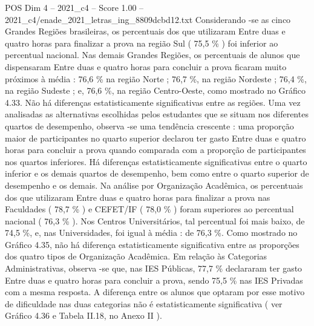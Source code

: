 \begin{textsample}{POS Dim 4 – 2021\_c4 – Score 1.00 – 2021\_c4/enade\_2021\_letras\_ing\_8809dcbd12.txt}
Considerando -se as cinco Grandes Regiões brasileiras, os percentuais dos que utilizaram Entre duas e quatro horas para finalizar a prova na região Sul ( 75,5 \% ) foi inferior ao percentual nacional.
Nas demais Grandes Regiões, os percentuais de alunos que dispensaram Entre duas e quatro horas para concluir a prova ficaram muito próximos à média : 76,6 \% na região Norte ; 76,7 \%, na região Nordeste ; 76,4 \%, na região Sudeste ; e, 76,6 \%, na região Centro-Oeste, como mostrado no Gráfico 4.33.
Não há diferenças estatisticamente significativas entre as regiões.
Uma vez analisadas as alternativas escolhidas pelos estudantes que se situam nos diferentes quartos de desempenho, observa -se uma tendência crescente : uma proporção maior de participantes no quarto superior declarou ter gasto Entre duas e quatro horas para concluir a prova quando comparada com a proporção de participantes nos quartos inferiores.
Há diferenças estatisticamente significativas entre o quarto inferior e os demais quartos de desempenho, bem como entre o quarto superior de desempenho e os demais.
Na análise por Organização Acadêmica, os percentuais dos que utilizaram Entre duas e quatro horas para finalizar a prova nas Faculdades ( 78,7 \% ) e CEFET/IF ( 78,0 \% ) foram superiores ao percentual nacional ( 76,3 \% ).
Nos Centros Universitários, tal percentual foi mais baixo, de 74,5 \%, e, nas Universidades, foi igual à média : de 76,3 \%.
Como mostrado no Gráfico 4.35, não há diferença estatisticamente significativa entre as proporções dos quatro tipos de Organização Acadêmica.
Em relação às Categorias Administrativas, observa -se que, nas IES Públicas, 77,7 \% declararam ter gasto Entre duas e quatro horas para concluir a prova, sendo 75,5 \% nas IES Privadas com a mesma resposta.
A diferença entre os alunos que optaram por esse motivo de dificuldade nas duas categorias não é estatisticamente significativa ( ver Gráfico 4.36 e Tabela II.18, no Anexo II ).

\end{textsample}
